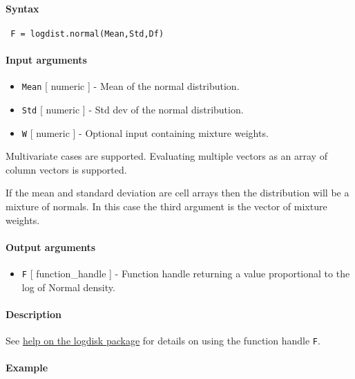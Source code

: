 


	\paragraph{Syntax}
 
 \begin{verbatim}
 F = logdist.normal(Mean,Std,Df)
 \end{verbatim}
 
 \paragraph{Input arguments}
 
 \begin{itemize}
 \item
   \texttt{Mean} {[} numeric {]} - Mean of the normal distribution.
 \item
   \texttt{Std} {[} numeric {]} - Std dev of the normal distribution.
 \item
   \texttt{W} {[} numeric {]} - Optional input containing mixture
   weights.
 \end{itemize}
 
 Multivariate cases are supported. Evaluating multiple vectors as an
 array of column vectors is supported.
 
 If the mean and standard deviation are cell arrays then the distribution
 will be a mixture of normals. In this case the third argument is the
 vector of mixture weights.
 
 \paragraph{Output arguments}
 
 \begin{itemize}
 \item
   \texttt{F} {[} function\_handle {]} - Function handle returning a
   value proportional to the log of Normal density.
 \end{itemize}
 
 \paragraph{Description}
 
 See \href{logdist/Contents}{help on the logdisk package} for details on
 using the function handle \texttt{F}.
 
 \paragraph{Example}


